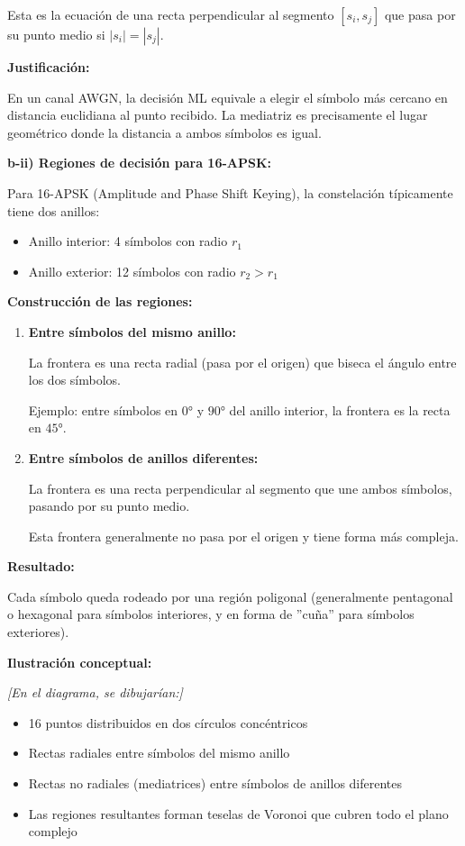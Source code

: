 \documentclass[11pt,a4paper]{article}
\begin{document}
Esta es la ecuaci\'on de una recta perpendicular al segmento $[s_i, s_j]$ que pasa por su punto medio si $|s_i| = |s_j|$.

\textbf{Justificaci\'on:}

En un canal AWGN, la decisi\'on ML equivale a elegir el s\'imbolo m\'as cercano en distancia euclidiana al punto recibido. La mediatriz es precisamente el lugar geom\'etrico donde la distancia a ambos s\'imbolos es igual.

\textbf{b-ii) Regiones de decisi\'on para 16-APSK:}

Para 16-APSK (Amplitude and Phase Shift Keying), la constelaci\'on t\'ipicamente tiene dos anillos:
\begin{itemize}
    \item Anillo interior: 4 s\'imbolos con radio $r_1$
    \item Anillo exterior: 12 s\'imbolos con radio $r_2 > r_1$
\end{itemize}

\textbf{Construcci\'on de las regiones:}

\begin{enumerate}
    \item \textbf{Entre s\'imbolos del mismo anillo:}
    
    La frontera es una recta radial (pasa por el origen) que biseca el \'angulo entre los dos s\'imbolos.
    
    Ejemplo: entre s\'imbolos en $0°$ y $90°$ del anillo interior, la frontera es la recta en $45°$.
    
    \item \textbf{Entre s\'imbolos de anillos diferentes:}
    
    La frontera es una recta perpendicular al segmento que une ambos s\'imbolos, pasando por su punto medio.
    
    Esta frontera generalmente no pasa por el origen y tiene forma m\'as compleja.
\end{enumerate}

\textbf{Resultado:}

Cada s\'imbolo queda rodeado por una regi\'on poligonal (generalmente pentagonal o hexagonal para s\'imbolos interiores, y en forma de ''cu\~na'' para s\'imbolos exteriores).

\textbf{Ilustraci\'on conceptual:}

\textit{[En el diagrama, se dibujar\'ian:]}
\begin{itemize}
    \item 16 puntos distribuidos en dos c\'irculos conc\'entricos
    \item Rectas radiales entre s\'imbolos del mismo anillo
    \item Rectas no radiales (mediatrices) entre s\'imbolos de anillos diferentes
    \item Las regiones resultantes forman teselas de Voronoi que cubren todo el plano complejo
\end{itemize}
\end{document}
